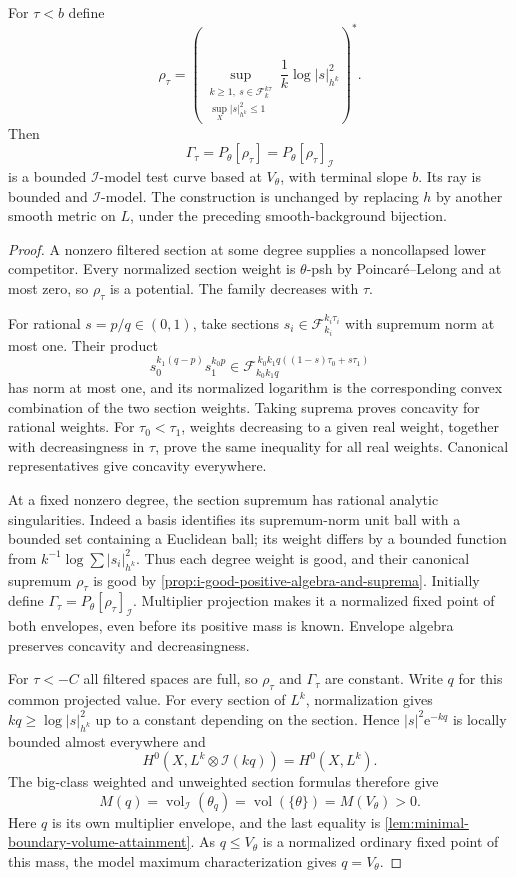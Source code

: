 \begin{theorem}\label{thm:filtration-model-test-curve}
For $\tau<b$ define
\[
 \rho_\tau=
 \left(\sup_{\substack{k\geq1,\ s\in\mathcal F_k^{k\tau}\\
                     \sup_X|s|_{h^k}^2\leq1}}
                      \frac1k\log|s|_{h^k}^2\right)^*.
\]
Then
\[
 \Gamma_\tau=P_\theta[\rho_\tau]
                 =P_\theta[\rho_\tau]_{\mathcal I}
\]
is a bounded $\mathcal I$-model test curve based at $V_\theta$, with terminal slope $b$. Its ray is bounded and $\mathcal I$-model. The construction is unchanged by replacing $h$ by another smooth metric on $L$, under the preceding smooth-background bijection.
\end{theorem}
\begin{proof}
A nonzero filtered section at some degree supplies a noncollapsed lower competitor. Every normalized section weight is $\theta$-psh by Poincar\'e--Lelong and at most zero, so $\rho_\tau$ is a potential. The family decreases with $\tau$.

For rational $s=p/q\in(0,1)$, take sections $s_i\in\mathcal F_{k_i}^{k_i\tau_i}$ with supremum norm at most one. Their product
\[
 s_0^{k_1(q-p)}s_1^{k_0p}
       \in\mathcal F_{k_0k_1q}^{\,k_0k_1q((1-s)\tau_0+s\tau_1)}
\]
has norm at most one, and its normalized logarithm is the corresponding convex combination of the two section weights. Taking suprema proves concavity for rational weights. For $\tau_0<\tau_1$, weights decreasing to a given real weight, together with decreasingness in $\tau$, prove the same inequality for all real weights. Canonical representatives give concavity everywhere.

At a fixed nonzero degree, the section supremum has rational analytic singularities. Indeed a basis identifies its supremum-norm unit ball with a bounded set containing a Euclidean ball; its weight differs by a bounded function from $k^{-1}\log\sum|s_i|_{h^k}^2$. Thus each degree weight is good, and their canonical supremum $\rho_\tau$ is good by \cref{prop:i-good-positive-algebra-and-suprema}. Initially define $\Gamma_\tau=P_\theta[\rho_\tau]_{\mathcal I}$. Multiplier projection makes it a normalized fixed point of both envelopes, even before its positive mass is known. Envelope algebra preserves concavity and decreasingness.

For $\tau<-C$ all filtered spaces are full, so $\rho_\tau$ and $\Gamma_\tau$ are constant. Write $q$ for this common projected value. For every section of $L^k$, normalization gives
$kq\geq\log|s|_{h^k}^2$ up to a constant depending on the section. Hence $|s|^2\mathrm e^{-kq}$ is locally bounded almost everywhere and
\[
 H^0(X,L^k\otimes\mathcal I(kq))=H^0(X,L^k).
\]
The big-class weighted and unweighted section formulas therefore give
\[
 M(q)=\operatorname{vol}_{\mathcal I}(\theta_q)
              =\operatorname{vol}(\{\theta\})=M(V_\theta)>0.
\]
Here $q$ is its own multiplier envelope, and the last equality is \cref{lem:minimal-boundary-volume-attainment}. As $q\leq V_\theta$ is a normalized ordinary fixed point of this mass, the model maximum characterization gives $q=V_\theta$.


\end{proof}
